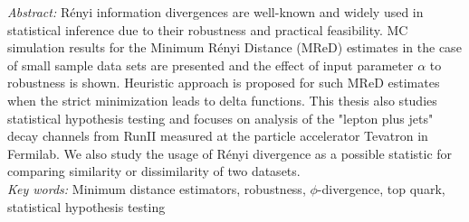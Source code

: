 {\textit{Abstract:} 
Rényi information divergences are well-known and widely used in statistical inference due to their robustness and practical feasibility. MC simulation results for the Minimum
Rényi Distance (MReD) estimates in the case of small sample data sets are presented and the
effect of input parameter $\alpha$ to robustness is shown. Heuristic approach is proposed for such MReD estimates when the strict minimization leads to delta functions. This thesis also studies statistical hypothesis testing and focuses on analysis of the "lepton plus jets" decay channels from RunII measured at the particle accelerator Tevatron in Fermilab. We also study the usage of Rényi divergence as a possible statistic for comparing similarity or dissimilarity of two datasets.
 \\

\textit{Key words:}  Minimum distance estimators, robustness, $\phi$-divergence, top quark, statistical hypothesis testing
}


